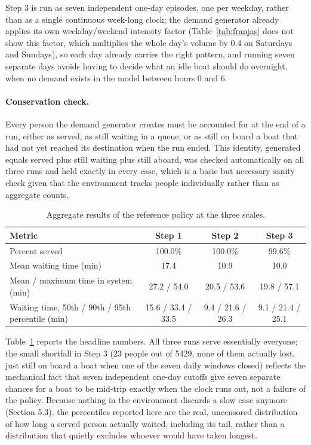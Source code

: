 \documentclass[11pt,a4paper]{article}
\begin{document}
Step 3 is run as seven independent one-day episodes, one per weekday, rather than as a single continuous week-long clock; the demand generator already applies its own weekday/weekend intensity factor (Table~\ref{tab:franjas} does not show this factor, which multiplies the whole day's volume by 0.4 on Saturdays and Sundays), so each day already carries the right pattern, and running seven separate days avoids having to decide what an idle boat should do overnight, when no demand exists in the model between hours 0 and 6.

\paragraph{Conservation check.} Every person the demand generator creates must be accounted for at the end of a run, either as served, as still waiting in a queue, or as still on board a boat that had not yet reached its destination when the run ended. This identity, generated equals served plus still waiting plus still aboard, was checked automatically on all three runs and held exactly in every case, which is a basic but necessary sanity check given that the environment tracks people individually rather than as aggregate counts.

\begin{table}[H]
\centering
\caption{Aggregate results of the reference policy at the three scales.}
\label{tab:resultados-escalones}
\footnotesize
\begin{tabular}{lccc}
\toprule
Metric & Step 1 & Step 2 & Step 3 \\
\midrule
Percent served & 100.0\% & 100.0\% & 99.6\% \\
Mean waiting time (min) & 17.4 & 10.9 & 10.0 \\
Mean / maximum time in system (min) & 27.2 / 54.0 & 20.5 / 53.6 & 19.8 / 57.1 \\
Waiting time, 50th / 90th / 95th percentile (min) & 15.6 / 33.4 / 33.5 & 9.4 / 21.6 / 26.3 & 9.1 / 21.4 / 25.1 \\
\bottomrule
\end{tabular}
\end{table}

Table~\ref{tab:resultados-escalones} reports the headline numbers. All three runs serve essentially everyone; the small shortfall in Step 3 (23 people out of 5429, none of them actually lost, just still on board a boat when one of the seven daily windows closed) reflects the mechanical fact that seven independent one-day cutoffs give seven separate chances for a boat to be mid-trip exactly when the clock runs out, not a failure of the policy. Because nothing in the environment discards a slow case anymore (Section 5.3), the percentiles reported here are the real, uncensored distribution of how long a served person actually waited, including its tail, rather than a distribution that quietly excludes whoever would have taken longest.
\end{document}
